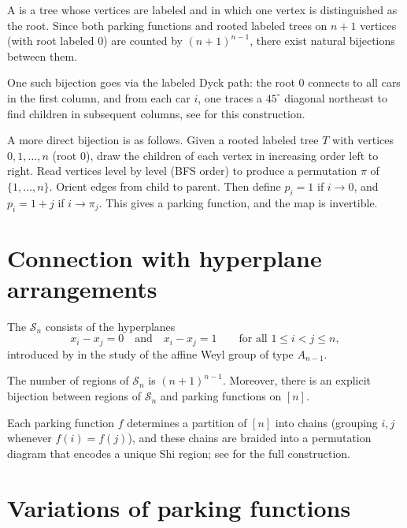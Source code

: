 A \label{rootedLabeledTreeDefinition} is a tree
whose vertices are labeled and in which one vertex is distinguished as the root.
Since both parking functions and rooted labeled trees on $n+1$ vertices
(with root labeled $0$) are counted by $(n+1)^{n-1}$,
there exist natural bijections between them.

One such bijection goes via the labeled Dyck path:
the root $0$ connects to all cars in the first column,
and from each car $i$, one traces a $45^\circ$ diagonal northeast
to find children in subsequent columns, see \cite{qtCatalanBook} for this construction.

A more direct bijection is as follows.
Given a rooted labeled tree $T$ with vertices $0,1,\dotsc,n$ (root $0$),
draw the children of each vertex in increasing order left to right.
Read vertices level by level (BFS order) to produce a permutation
$\pi$ of $\{1,\dotsc,n\}$.
Orient edges from child to parent. Then define $p_i = 1$ if $i \to 0$,
and $p_i = 1+j$ if $i \to \pi_j$.
This gives a parking function, and the map is invertible.



\section[parkingFunctionsHyperplanes]{Connection with hyperplane arrangements}

The \label{shiArrangementDefinition}
$\mathcal{S}_n$ consists of the hyperplanes
\[
x_i - x_j = 0 \quad \text{and} \quad x_i - x_j = 1
\qquad \text{for all } 1 \leq i < j \leq n,
\]
introduced by  in the study of the affine Weyl group
of type $A_{n-1}$.

\begin{theorem}
The number of regions of $\mathcal{S}_n$ is $(n+1)^{n-1}$.
Moreover, there is an explicit bijection between regions of $\mathcal{S}_n$
and parking functions on $[n]$.
\end{theorem}

Each parking function $f$ determines a partition of $[n]$ into chains
(grouping $i,j$ whenever $f(i)=f(j)$), and these chains are braided into a
permutation diagram that encodes a unique Shi region;
see \cite{AthanasiadisLinusson1999} for the full construction.


\section[parkingFunctionVariations]{Variations of parking functions}

